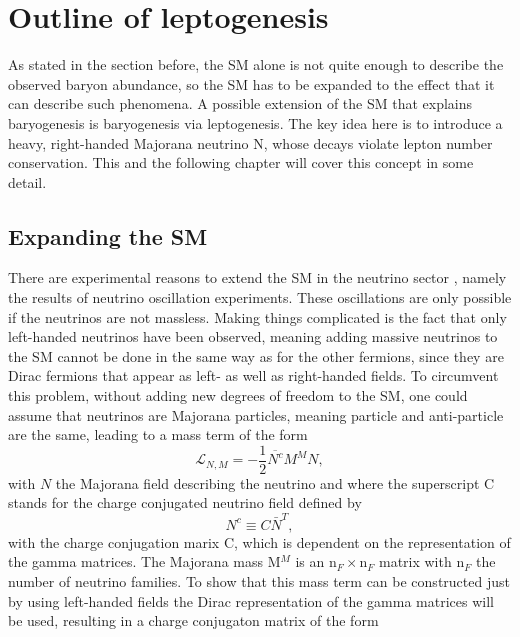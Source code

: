 \chapter{Outline of leptogenesis}
As stated in the section before, the SM alone is not quite enough to describe the observed baryon abundance, so the SM has to be expanded to the effect that it can describe such phenomena. \newline\indent
A possible extension of the SM that explains baryogenesis is baryogenesis via leptogenesis. The key idea here is to introduce a heavy, right-handed Majorana neutrino N, whose decays violate lepton number conservation. \newline\indent
This and the following chapter will cover this concept in some detail.
\section{Expanding the SM}
There are experimental reasons to extend the SM in the neutrino sector , namely the results of neutrino oscillation experiments. These oscillations are only possible if the neutrinos are not massless. Making things complicated is the fact that only left-handed neutrinos have been observed, meaning adding massive neutrinos to the SM cannot be done in the same way as for the other fermions, since they are Dirac fermions that appear as left- as well as right-handed fields. To circumvent this problem, without adding new degrees of freedom to the SM, one could assume that neutrinos are Majorana particles, meaning particle and anti-particle are the same, leading to a mass term of the form \cite{Drewes:2013gca}
\begin{equation}
\mathcal{L}_{N,M}=-\frac{1}{2}\overline{N^c}M^MN,
\label{eq:neutrino_majorana}
\end{equation}
with $N$ the Majorana field describing the neutrino and where the superscript C stands for the charge conjugated neutrino field defined by
\begin{equation*}
	N^c\equiv C\bar{N}^T,
\end{equation*}
with the charge conjugation marix C, which is dependent on the representation of the gamma matrices. The Majorana mass M$^M$ is an n$_F\times$n$_F$ matrix with n$_F$ the number of neutrino families. \newline\indent
To show that this mass term can be constructed just by using left-handed fields the Dirac representation of the gamma matrices will be used, resulting in a charge conjugaton matrix of the form
